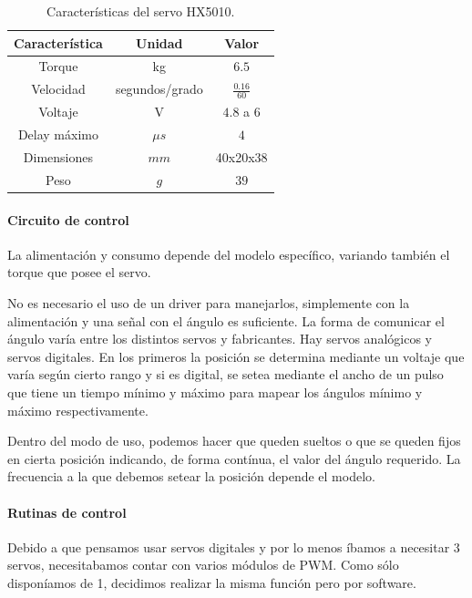 \begin{table}
	\begin{center}
		\begin{tabular}{|c|c|c|}
			\hline
			Caracter\'istica & Unidad & Valor \\
			\hline
			Torque & kg & $6.5$ \\
			Velocidad & segundos/grado & $\frac{0.16}{60}$ \\
			Voltaje & V & $4.8$ a $6$ \\
			Delay m\'aximo & $\mu s$ & $4$ \\
			Dimensiones & $mm$ & 40x20x38 \\
			Peso & $g$ & $39$ \\
			\hline
		\end{tabular}
	\end{center}
	\caption{Caracter\'isticas del servo HX5010.}
	\label{hT_hx5010}
\end{table}

\paragraph{Circuito de control}
\label{h_actuadores_servo_circuito}

La alimentaci\'on y consumo depende del modelo espec\'ifico, variando tambi\'en el torque que posee el servo.

No es necesario el uso de un driver para manejarlos, simplemente con la alimentaci\'on y una se\~nal con el \'angulo es suficiente.
La forma de comunicar el \'angulo var\'ia entre los distintos servos y fabricantes.
Hay servos anal\'ogicos y servos digitales.
En los primeros la posici\'on se determina mediante un voltaje que var\'ia seg\'un cierto rango y si es digital, se setea mediante el ancho de
un pulso que tiene un tiempo m\'inimo y m\'aximo para mapear los \'angulos m\'inimo y m\'aximo respectivamente.

Dentro del modo de uso, podemos hacer que queden sueltos o que se queden fijos en cierta posici\'on indicando, de forma cont\'inua, el valor
del \'angulo requerido.
La frecuencia a la que debemos setear la posici\'on depende el modelo.

\paragraph{Rutinas de control}
\label{h_actuadores_servo_rutinas}

Debido a que pensamos usar servos digitales y por lo menos \'ibamos a necesitar $3$ servos, necesitabamos contar con varios m\'odulos de PWM.
Como s\'olo dispon\'iamos de 1, decidimos realizar la misma funci\'on pero por software.

